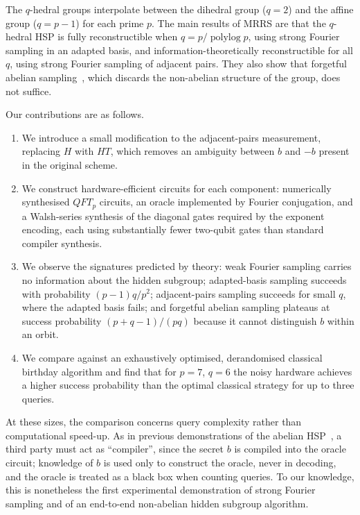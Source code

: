 The $q$-hedral groups interpolate between the dihedral group ($q=2$) and the affine group ($q=p-1$) for each prime $p$. The main results of MRRS are that the $q$-hedral HSP is fully reconstructible when $q = p/\operatorname{polylog} p$, using strong Fourier sampling in an adapted basis, and information-theoretically reconstructible for all $q$, using strong Fourier sampling of adjacent pairs. They also show that forgetful abelian sampling~\cite{ettinger1999quantum}, which discards the non-abelian structure of the group, does not suffice.

 Our contributions are as follows.
\begin{enumerate}
    \item We introduce a small modification to the adjacent-pairs measurement, replacing $H$ with $HT$, which removes an ambiguity between $b$ and $-b$ present in the original scheme.
    \item We construct hardware-efficient circuits for each component: numerically synthesised $QFT_p$ circuits, an oracle implemented by Fourier conjugation, and a Walsh-series synthesis of the diagonal gates required by the exponent encoding, each using substantially fewer two-qubit gates than standard compiler synthesis.
    \item We observe the signatures predicted by theory: weak Fourier sampling carries no information about the hidden subgroup; adapted-basis sampling succeeds with probability $(p-1)q/p^2$; adjacent-pairs sampling succeeds for small $q$, where the adapted basis fails; and forgetful abelian sampling plateaus at success probability $(p+q-1)/(pq)$ because it cannot distinguish $b$ within an orbit.
    \item We compare against an exhaustively optimised, derandomised classical birthday algorithm and find that for $p=7$, $q=6$ the noisy hardware achieves a higher success probability than the optimal classical strategy for up to three queries.
\end{enumerate}

At these sizes, the comparison concerns query complexity rather than computational speed-up. As in previous demonstrations of the abelian HSP~\cite{singkanipa2025demonstration}, a third party must act as ``compiler'', since the secret $b$ is compiled into the oracle circuit; knowledge of $b$ is used only to construct the oracle, never in decoding, and the oracle is treated as a black box when counting queries.  To our knowledge, this is nonetheless the first experimental demonstration of strong Fourier sampling and of an end-to-end non-abelian hidden subgroup algorithm.

